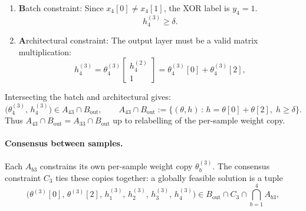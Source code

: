 \begin{enumerate}
  \item \textbf{B}atch constraint: Since $x_4[0]\ne x_4[1]$, the XOR label is $y_4=1$. 
\begin{equation*}
h_4^{(3)} \ge \delta.
\end{equation*}

\item \textbf{A}rchitectural constraint: The output layer must be a valid matrix multiplication:
\begin{equation*}
h_4^{(3)} = \theta_4^{(3)}  \begin{bmatrix} h_4^{(2)} \\ 1 \end{bmatrix}
= \theta_4^{(3)}[0] + \theta_4^{(3)}[2],
\end{equation*}
\end{enumerate} 
Intersecting the batch and architectural gives:
\begin{equation*}
  \bigl(\theta_4^{(3)},\, h_4^{(3)}\bigr) \in A_{43} \cap B_{\mathrm{out}}, \qquad
  A_{43} \cap B_{\mathrm{out}} := \bigl\{(\theta,h) \,:\, h = \theta[0] + \theta[2],\; h \ge \delta\bigr\}.
\end{equation*}
Thus $A_{43} \cap B_{\mathrm{out}} = A_{33} \cap B_{\mathrm{out}}$ up to relabelling of the per-sample weight copy.

\paragraph{Consensus between samples.}
Each $A_{b3}$ constrains its own per-sample weight copy $\theta_b^{(3)}$. The consensus constraint $C_3$ ties these copies together: a globally feasible solution is a tuple
\begin{equation*}
  \bigl(\theta^{(3)}[0],\, \theta^{(3)}[2],\,
             h_1^{(3)},\, h_2^{(3)},\, h_3^{(3)},\, h_4^{(3)}\bigr)
\in B_{\mathrm{out}}\cap C_3 \cap \bigcap_{b=1}^{4} A_{b3} ,
\end{equation*}

